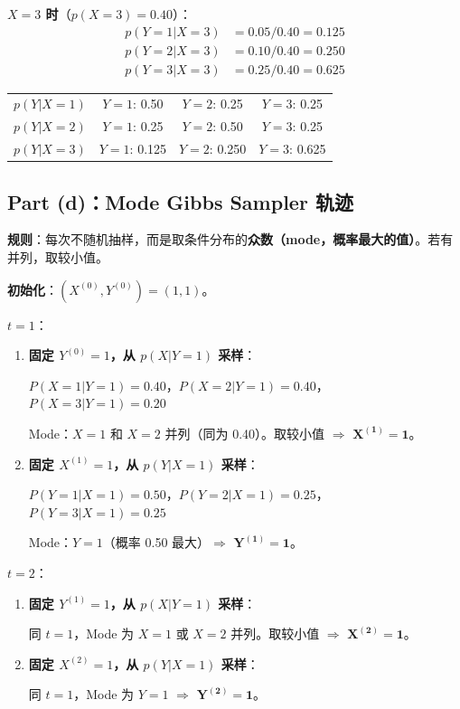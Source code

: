 \documentclass[11pt,a4paper]{article}
\begin{document}
\textbf{$X = 3$ 时}（$p(X\!=\!3) = 0.40$）：
\begin{align*}
p(Y\!=\!1 | X\!=\!3) &= 0.05 / 0.40 = 0.125 \\
p(Y\!=\!2 | X\!=\!3) &= 0.10 / 0.40 = 0.250 \\
p(Y\!=\!3 | X\!=\!3) &= 0.25 / 0.40 = 0.625
\end{align*}

\begin{center}
\begin{tabular}{c|ccc}
$p(Y|X\!=\!1)$ & $Y\!=\!1$: 0.50 & $Y\!=\!2$: 0.25 & $Y\!=\!3$: 0.25 \\
$p(Y|X\!=\!2)$ & $Y\!=\!1$: 0.25 & $Y\!=\!2$: 0.50 & $Y\!=\!3$: 0.25 \\
$p(Y|X\!=\!3)$ & $Y\!=\!1$: 0.125 & $Y\!=\!2$: 0.250 & $Y\!=\!3$: 0.625
\end{tabular}
\end{center}

\subsection*{Part (d)：Mode Gibbs Sampler 轨迹}

\textbf{规则}：每次不随机抽样，而是取条件分布的\textbf{众数（mode，概率最大的值）}。若有并列，取较小值。

\medskip
\textbf{初始化}：$(X^{(0)}, Y^{(0)}) = (1, 1)$。

\bigskip
\textbf{$t = 1$}：

\begin{enumerate}[leftmargin=2em]
    \item \textbf{固定 $Y^{(0)} = 1$，从 $p(X | Y\!=\!1)$ 采样}：

    $P(X\!=\!1|Y\!=\!1) = 0.40$，$P(X\!=\!2|Y\!=\!1) = 0.40$，$P(X\!=\!3|Y\!=\!1) = 0.20$

    Mode：$X=1$ 和 $X=2$ 并列（同为 0.40）。取较小值 $\Rightarrow$ $\boldsymbol{X^{(1)} = 1}$。

    \item \textbf{固定 $X^{(1)} = 1$，从 $p(Y | X\!=\!1)$ 采样}：

    $P(Y\!=\!1|X\!=\!1) = 0.50$，$P(Y\!=\!2|X\!=\!1) = 0.25$，$P(Y\!=\!3|X\!=\!1) = 0.25$

    Mode：$Y=1$（概率 0.50 最大）$\Rightarrow$ $\boldsymbol{Y^{(1)} = 1}$。
\end{enumerate}

\textbf{$t = 2$}：

\begin{enumerate}[leftmargin=2em]
    \item \textbf{固定 $Y^{(1)} = 1$，从 $p(X | Y\!=\!1)$ 采样}：

    同 $t=1$，Mode 为 $X=1$ 或 $X=2$ 并列。取较小值 $\Rightarrow$ $\boldsymbol{X^{(2)} = 1}$。

    \item \textbf{固定 $X^{(2)} = 1$，从 $p(Y | X\!=\!1)$ 采样}：

    同 $t=1$，Mode 为 $Y=1$ $\Rightarrow$ $\boldsymbol{Y^{(2)} = 1}$。
\end{enumerate}
\end{document}
